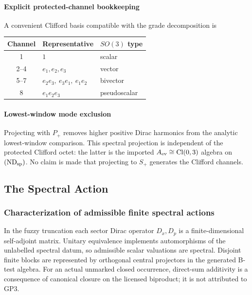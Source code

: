 \documentclass[12pt,a4paper]{article}
\begin{document}
\paragraph{Explicit protected-channel bookkeeping}

A convenient Clifford basis compatible with the grade decomposition is
\begin{center}
\begin{tabular}{cll}
\toprule
Channel & Representative & \(SO(3)\) type \\
\midrule
1 & \(1\) & scalar \\
2--4 & \(e_1,e_2,e_3\) & vector \\
5--7 & \(e_2e_3,\ e_3e_1,\ e_1e_2\) & bivector \\
8 & \(e_1e_2e_3\) & pseudoscalar \\
\bottomrule
\end{tabular}
\end{center}

\paragraph{Lowest-window mode exclusion}
Projecting with \(P_+\) removes higher positive Dirac harmonics from the
analytic lowest-window comparison.  This spectral projection is independent
of the protected Clifford octet: the latter is the imported
\(A_{\rm ev}\cong\operatorname{Cl}(0,3)\) algebra on \((\mathrm{ND}_{\rm sp})\).  No
claim is made that projecting to \(S_+\) generates the Clifford channels.

\subsection{The Spectral Action}
\label{p3:sec:spectralaction}


\subsubsection{Characterization of admissible finite spectral actions}
\label{p3:sec:uniqueness_spectral_action}


In the fuzzy truncation each sector Dirac operator $D_x,D_p$ is a finite-dimensional
self-adjoint matrix.  Unitary equivalence implements automorphisms of the unlabelled
spectral datum, so admissible scalar valuations are spectral.  Disjoint finite
blocks are represented by orthogonal central projectors in the generated
B-test algebra.  For an actual unmarked closed occurrence, direct-sum
additivity is a consequence of canonical closure on the licensed biproduct;
it is not attributed to GP3.
\end{document}
